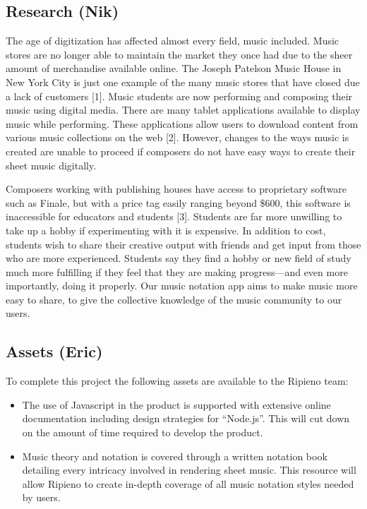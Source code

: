 \documentclass[12pt]{article}
\begin{document}
\subsection{Research (Nik)}
The age of digitization has affected almost every field, music included. Music stores are no longer able to maintain the market they once had due to the sheer amount of merchandise available online. The Joseph Patelson Music House in New York City is just one example of the many music stores that have closed due a lack of customers [1].  Music students are now performing and composing their music using digital media. There are many tablet applications available to display music while performing. These applications allow users to download content from various music collections on the web [2]. However, changes to the ways music is created are unable to proceed if composers do not have easy ways to create their sheet music digitally.

Composers working with publishing houses have access to proprietary software such as Finale, but with a price tag easily ranging beyond \$600, this software is inaccessible for educators and students [3]. Students are far more unwilling to take up a hobby if experimenting with it is expensive. In addition to cost, students wish to share their creative output with friends and get input from those who are more experienced.  Students say they find a hobby or new field of study much more fulfilling if they feel that they are making progress---and even more importantly, doing it properly. Our music notation app aims to make music more easy to share, to give the collective knowledge of the music community to our users.

\subsection{Assets (Eric)}
To complete this project the following assets are available to the Ripieno team:
\begin{itemize}
\item The use of Javascript in the product is supported with extensive online documentation including design strategies for ``Node.js''. This will cut down on the amount of time required to develop the product.
\item Music theory and notation is covered through a written notation book detailing every intricacy involved in rendering sheet music. This resource will allow Ripieno to create in-depth coverage of all music notation styles needed by users.
\end{itemize}
\end{document}
